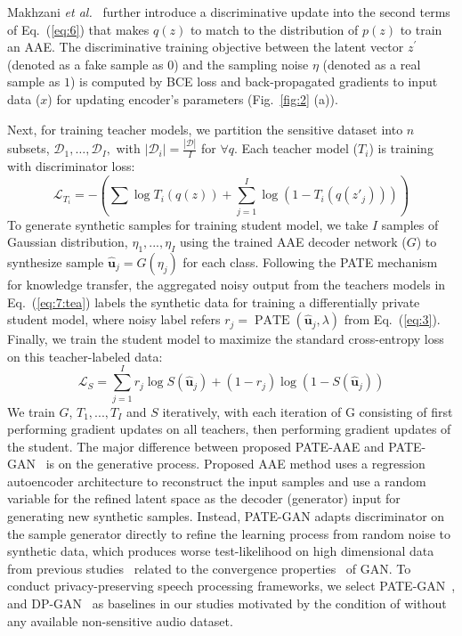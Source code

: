 \documentclass[a4paper]{article}
\begin{document}
Makhzani \emph{et al.}~\cite{makhzani2015adversarial} further introduce a discriminative update into the second terms of Eq.~(\ref{eq:6}) that makes $q(z)$ to match to the distribution of $p(z)$ to train an AAE. The discriminative training objective between the latent vector $z^{\prime}$ (denoted as a fake sample as $0$) and the sampling noise $\eta$ (denoted as a real sample as $1$) is computed by BCE loss and back-propagated gradients to input data ($x$) for updating encoder's parameters (Fig.~\ref{fig:2} (a)).


Next, for training teacher models, we partition the sensitive dataset into $n$ subsets, $\mathcal{D}_{1}, \ldots, \mathcal{D}_{I},$ with $\left|\mathcal{D}_{i}\right|=\frac{|\mathcal{D}|}{I}$ for $\forall q$. Each teacher model ($T_i$) is training with discriminator loss:
\begin{equation}
\mathcal{L}_{T_i}=-(\sum_{} \log T_{i}\left(q(z) \right)+\sum_{j=1}^{I} \log \left(1-T_{i}\left(q\left(z{'}_{j}\right) \right)\right))
\label{eq:7:tea}
\end{equation}
To generate synthetic samples for training student model, we take $I$ samples of Gaussian distribution, $\eta_{1}, ..., \eta_{I}$ using the trained AAE decoder network ($G$) to synthesize sample $\hat{\mathbf{u}}_{j}=G\left(\eta_{j}\right)$
for each class. Following the PATE mechanism for knowledge transfer, the aggregated noisy output from the teachers models in Eq.~(\ref{eq:7:tea}) labels the synthetic data for training a differentially private student model, where noisy label refers $r_{j}=\operatorname{PATE}\left(\hat{\mathbf{u}}_{j}, \lambda\right)$ from Eq.~(\ref{eq:3}). Finally, we train the student model to maximize the standard cross-entropy loss on this teacher-labeled data:
\begin{equation}
\mathcal{L}_{S}=\sum_{j=1}^{I} r_{j} \log S\left(\hat{\mathbf{u}}_{j} \right)+\left(1-r_{j}\right) \log \left(1-S\left(\hat{\mathbf{u}}_{j} \right)\right)
\end{equation}
We train $G$, $T_{1},...,T_I$ and $S$ iteratively, with each iteration of G consisting of first performing gradient updates on all teachers, then performing gradient updates of the student. The major difference between proposed PATE-AAE and PATE-GAN~\cite{jordon2019pate} is on the generative process. Proposed AAE method uses a regression autoencoder architecture to reconstruct the input samples and use a random variable for the refined latent space as the decoder (generator) input for generating new synthetic samples. Instead, PATE-GAN adapts discriminator on the sample generator directly to refine the learning process from random noise to synthetic data, which produces worse test-likelihood on high dimensional data from previous studies~\cite{chen2020gs, chen2020gan} related to the convergence properties~\cite{kodali2017convergence} of GAN. To conduct privacy-preserving speech processing frameworks, we select PATE-GAN~\cite{jordon2019pate}, and DP-GAN~\cite{xie2018differentially} as baselines in our studies motivated by the condition of without any available non-sensitive audio dataset.
\end{document}
